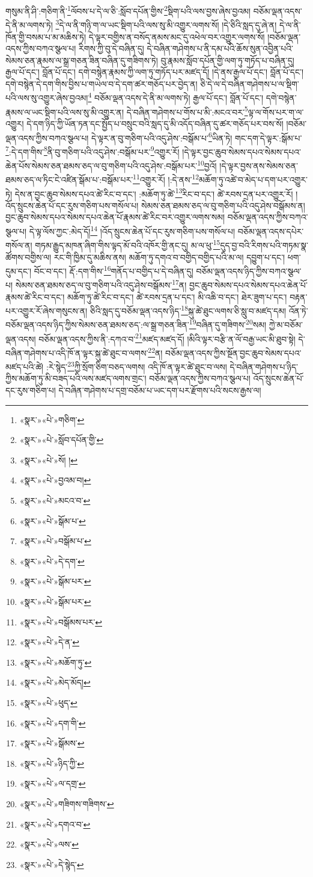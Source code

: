 གསུམ་ནི་ཤི་:གཅིག་ནི་\footnote{«སྣར་»«པེ་»གཅིག་}ལོབས་པ་དེ་ལ་ཅི་:སློབ་དཔོན་གྱིས་\footnote{«སྣར་»«པེ་»སློབ་དཔོན་གྱི་}སྡིག་པའི་ལས་བྱས་ཞེས་བྱའམ། བཅོམ་ལྡན་འདས་དེ་ནི་མ་ལགས་ཏེ། \footnote{«སྣར་»«པེ་»སོ། ། }དེ་ལ་ནི་གཉི་ག་ལ་ཡང་སྡིག་པའི་ལས་སུ་མི་འགྱུར་ལགས་སོ། །དེ་ཅིའི་སླད་དུ་ཞེ་ན། དེ་ལ་ནི་ཁོན་གྱི་བསམ་པ་མ་མཆིས་ཏེ། དེ་ལྟར་བགྱིས་ན་བསོད་ནམས་མང་དུ་འཕེལ་བར་འགྱུར་ལགས་སོ། །བཅོམ་ལྡན་འདས་ཀྱིས་བཀའ་སྩལ་པ། རིགས་ཀྱི་བུ་དེ་བཞིན་དུ། དེ་བཞིན་གཤེགས་པ་ནི་དམ་པའི་ཆོས་སུན་འབྱིན་པའི་སེམས་ཅན་རྣམས་ལ་སྒྲ་གཅན་ཟིན་བཞིན་དུ་གཟིགས་ཏེ། བུ་རྣམས་སློབ་དཔོན་གྱི་ལག་ཏུ་གཏོད་པ་བཞིན་དུ། རྒྱལ་པོ་དང་། བློན་པོ་དང་། དགེ་བསྙེན་རྣམས་ཀྱི་ལག་ཏུ་གཏོད་པར་མཛད་དོ། །དེ་ནས་རྒྱལ་པོ་དང་། བློན་པོ་དང་། དགེ་བསྙེན་དེ་དག་གིས་བྱིས་པ་གཡེལ་བ་དེ་དག་ཚར་གཅོད་པར་བྱེད་ན། ཅི་དེ་ལ་དེ་བཞིན་གཤེགས་པ་ལ་སྡིག་པའི་ལས་སུ་འགྱུར་ཞེས་བྱའམ།\footnote{«སྣར་»«པེ་»བྱའམ་བ།} བཅོམ་ལྡན་འདས་དེ་ནི་མ་ལགས་ཏེ། རྒྱལ་པོ་དང་། བློན་པོ་དང་། དགེ་བསྙེན་རྣམས་ལ་ཡང་སྡིག་པའི་ལས་སུ་མི་འགྱུར་ན། དེ་བཞིན་གཤེགས་པ་གོས་པ་མི་:མངའ་བར་\footnote{«སྣར་»«པེ་»མངའ་བ་}ལྟ་ལ་གོས་པར་ག་ལ་འགྱུར། དེ་དག་ཉིད་ཀྱི་ཡོན་ཏན་དང་སྤྱོད་པ་བསྲུང་བའི་སླད་དུ་མི་འདོད་བཞིན་དུ་ཚར་གཅོད་པར་བས་སོ། །བཅོམ་ལྡན་འདས་ཀྱིས་བཀའ་སྩལ་པ། དེ་ལྟར་ན་བུ་གཅིག་པའི་འདུ་ཤེས་:བསྒོམ་པ་\footnote{«སྣར་»«པེ་»སྒོམ་པ་}ཡིན་ཏེ། གང་དག་དེ་ལྟར་:སྒོམ་པ་\footnote{«སྣར་»«པེ་»བསྒོམ་པ་}:དེ་དག་གིས་\footnote{«སྣར་»«པེ་»དེ་དག་}ནི་བུ་གཅིག་པའི་འདུ་ཤེས་:བསྒོམ་པར་\footnote{«སྣར་»«པེ་»སྒོམ་པར་}འགྱུར་རོ། །དེ་ལྟར་བྱང་ཆུབ་སེམས་དཔའ་སེམས་དཔའ་ཆེན་པོས་སེམས་ཅན་ཐམས་ཅད་ལ་བུ་གཅིག་པའི་འདུ་ཤེས་:བསྒོམ་པར་\footnote{«སྣར་»«པེ་»སྒོམ་པར་}བྱའོ། །དེ་ལྟར་བྱས་ནས་སེམས་ཅན་ཐམས་ཅད་ལ་ཏིང་ངེ་འཛིན་སྒོམ་པ་:བསྒོམ་པར་\footnote{«སྣར་»«པེ་»བསྒོམས་པར་}འགྱུར་རོ། །:དེ་ནས་\footnote{«སྣར་»«པེ་»དེ་ན་}མཆོག་ཏུ་འཚེ་བ་མེད་པ་དག་པར་འགྱུར་ཏེ། དེས་ན་བྱང་ཆུབ་སེམས་དཔའ་ཚེ་རིང་བ་དང་། :མཆོག་ཏུ་ཚེ་\footnote{«སྣར་»«པེ་»མཆོག་ཏུ་}རིང་བ་དང་། ཚེ་རབས་དྲན་པར་འགྱུར་རོ། །འོད་སྲུངས་ཆེན་པོ་དང་རུས་གཅིག་པས་གསོལ་པ། སེམས་ཅན་ཐམས་ཅད་ལ་བུ་གཅིག་པའི་འདུ་ཤེས་བསྒོམས་ན། བྱང་ཆུབ་སེམས་དཔའ་སེམས་དཔའ་ཆེན་པོ་རྣམས་ཚེ་རིང་བར་འགྱུར་ལགས་སམ། བཅོམ་ལྡན་འདས་ཀྱིས་བཀའ་སྩལ་པ། དེ་ལྟ་ལོས་ཀྱང་:མེད་དོ།\footnote{«སྣར་»«པེ་»མེད་མོད།} །འོད་སྲུངས་ཆེན་པོ་དང་རུས་གཅིག་པས་གསོལ་པ། བཅོམ་ལྡན་འདས་དཔེར་གསོལ་ན། གཏམ་རྒྱུད་མཁན་ཞིག་གིས་ལྟད་མོ་བའི་འཁོར་གྱི་ནང་དུ། མ་ལ་ཕུ་\footnote{«སྣར་»«པེ་»ཕུད་}དུད་བྱ་བའི་རིགས་པའི་གཏམ་སྣ་ཚོགས་བགྱིས་ལ། རང་གི་ཁྱིམ་དུ་མཆིས་ནས། མཆོག་ཏུ་དགའ་བ་བགྱིད་བགྱིད་པའི་མ་ལ། དབྱུག་པ་དང་། ཕག་དུམ་དང་། བོང་བ་དང་། རྡོ་:དག་གིས་\footnote{«སྣར་»«པེ་»དག་གི་}གནོད་པ་བགྱིད་པ་དེ་བཞིན་དུ། བཅོམ་ལྡན་འདས་ཉིད་ཀྱིས་བཀའ་སྩལ་པ། སེམས་ཅན་ཐམས་ཅད་ལ་བུ་གཅིག་པའི་འདུ་ཤེས་བསྒོམས་\footnote{«སྣར་»«པེ་»སྒོམས་}ན། བྱང་ཆུབ་སེམས་དཔའ་སེམས་དཔའ་ཆེན་པོ་རྣམས་ཚེ་རིང་བ་དང་། མཆོག་ཏུ་ཚེ་རིང་བ་དང་། ཚེ་རབས་དྲན་པ་དང་། མི་འཆི་བ་དང་། ཐེར་ཟུག་པ་དང་། བརྟན་པར་འགྱུར་རོ་ཞེས་གསུངས་ན། ཅིའི་སླད་དུ་བཅོམ་ལྡན་འདས་ཉིད་\footnote{«སྣར་»«པེ་»ཉིད་ཀྱི་}སྐུ་ཚེ་ཐུང་ལགས་ཅི་སླུ་བ་མཛད་དམ། འོན་ཏེ་བཅོམ་ལྡན་འདས་ཉིད་ཀྱིས་སེམས་ཅན་ཐམས་ཅད་:ལ་སྒྲ་གཅན་ཟིན་\footnote{«སྣར་»«པེ་»ལ་དགྲ་}བཞིན་དུ་གཟིགས་\footnote{«སྣར་»«པེ་»གཟིགས་གཟིགས་}སམ། ཀྱེ་མ་བཅོམ་ལྡན་འདས། བཅོམ་ལྡན་འདས་ཀྱིས་ནི་:དཀའ་བ་\footnote{«སྣར་»«པེ་»དགའ་བ་}མཛད་མཛད་དོ། །མིའི་ལྟར་བརྩི་ན་ལོ་བརྒྱ་ཡང་མི་ཐུབ་སྟེ། དེ་བཞིན་གཤེགས་པ་འདི་ཁོ་ན་ལྟར་སྐུ་ཚེ་ཐུང་བ་ལགས་\footnote{«སྣར་»«པེ་»ལས་}ན། བཅོམ་ལྡན་འདས་ཀྱིས་སྔོན་བྱང་ཆུབ་སེམས་དཔའ་མཛད་པའི་ཚེ། :རེ་སྙེད་\footnote{«སྣར་»«པེ་»དེ་སྙེད་}ཀྱི་སྲོག་ཅིག་བཅད་ལགས། འདི་ཁོ་ན་ལྟར་ཚེ་ཐུང་བ་ལས། དེ་བཞིན་གཤེགས་པ་ཉིད་ཀྱིས་མཆོག་ཏུ་མི་བཟད་པའི་ལས་མཛད་ལགས་གྲང་། བཅོམ་ལྡན་འདས་ཀྱིས་བཀའ་སྩལ་པ། འོད་སྲུངས་ཆེན་པོ་དང་རུས་གཅིག་པ། དེ་བཞིན་གཤེགས་པ་དགྲ་བཅོམ་པ་ཡང་དག་པར་རྫོགས་པའི་སངས་རྒྱས་ལ། 